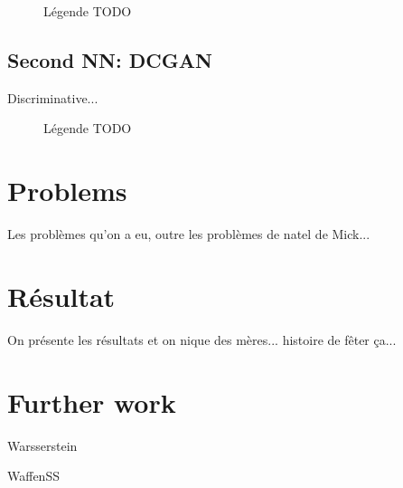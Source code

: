 \documentclass[
  10pt, 
  a4paper,
  oneside, 
  headinclude, 
  footinclude, 
  BCOR5mm, 
]{scrartcl}
\begin{document}
\begin{figure}[!h]
  \caption{Légende TODO}
  \label{s1-anaylse-v2}
\end{figure}

\subsection{Second NN: DCGAN}

Discriminative...

\begin{figure}[!h]
  \caption{Légende TODO}
  \label{s1-anaylse-v2}
\end{figure}


\section{Problems}

Les problèmes qu'on a eu, outre les problèmes de natel de Mick...


\section{Résultat}

On présente les résultats et on nique des mères... histoire de fêter ça...


\section{Further work}

Warsserstein

WaffenSS


\newpage

\tableofcontents
\listoffigures
\listoftables

\begin{thebibliography}{9}
\end{thebibliography}
\end{document}
